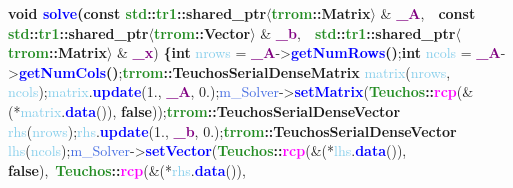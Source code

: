          \tab\textbf{\textcolor{BrickRed}{void} \textcolor{blue}{solve}(const \textcolor{ForestGreen}{std}::\textcolor{ForestGreen}{tr1}::\textcolor{Melon}{shared\_ptr}$\langle$\textcolor{ForestGreen}{trrom}::\textcolor{Melon}{Matrix}$\rangle$} \& \textbf{\textcolor{Purple}{\_A}},\newline\tab\tab\tab\ \ \textbf{const \textcolor{ForestGreen}{std}::\textcolor{ForestGreen}{tr1}::\textcolor{Melon}{shared\_ptr}$\langle$\textcolor{ForestGreen}{trrom}::\textcolor{Melon}{Vector}$\rangle$} \& \textbf{\textcolor{Purple}{\_b}},\newline\tab\tab\tab\ \ \textbf{\textcolor{ForestGreen}{std}::\textcolor{ForestGreen}{tr1}::\textcolor{Melon}{shared\_ptr}$\langle$\textcolor{ForestGreen}{trrom}::\textcolor{Melon}{Matrix}$\rangle$} \& \textbf{\textcolor{Purple}{\_x}}) \textbf{\{}\newline\tab\tab\textbf{\textcolor{BrickRed}{int}} \textcolor{SkyBlue}{nrows} = \textbf{\textcolor{Purple}{\_A}}-\textgreater\textbf{\textcolor{blue}{getNumRows}()};\newline\tab\tab\textbf{\textcolor{BrickRed}{int}} \textcolor{SkyBlue}{ncols} = \textbf{\textcolor{Purple}{\_A}}-\textgreater\textbf{\textcolor{blue}{getNumCols}()};\newline\newline\tab\tab\textbf{\textcolor{ForestGreen}{trrom}::\textcolor{Melon}{TeuchosSerialDenseMatrix}} \textcolor{SkyBlue}{matrix}(\textcolor{SkyBlue}{nrows}, \textcolor{SkyBlue}{ncols});\newline\tab\tab\textcolor{SkyBlue}{matrix}.\textbf{\textcolor{blue}{update}}(1., \textbf{\textcolor{Purple}{\_A}}, 0.);\newline\tab\tab\textcolor{RoyalBlue}{m\_Solver}-\textgreater\textbf{\textcolor{blue}{setMatrix}}(\textbf{\textcolor{ForestGreen}{Teuchos}::\textcolor{magenta}{rcp}}(\&(*\textcolor{SkyBlue}{matrix}.\textbf{\textcolor{blue}{data}}()), \textbf{false}));\newline\newline\tab\tab\textbf{\textcolor{ForestGreen}{trrom}::\textcolor{Melon}{TeuchosSerialDenseVector}} \textcolor{SkyBlue}{rhs}(\textcolor{SkyBlue}{nrows});\newline\tab\tab\textcolor{SkyBlue}{rhs}.\textbf{\textcolor{blue}{update}}(1., \textbf{\textcolor{Purple}{\_b}}, 0.);\newline\tab\tab\textbf{\textcolor{ForestGreen}{trrom}::\textcolor{Melon}{TeuchosSerialDenseVector}} \textcolor{SkyBlue}{lhs}(\textcolor{SkyBlue}{ncols});\newline\tab\tab\textcolor{RoyalBlue}{m\_Solver}-\textgreater\textbf{\textcolor{blue}{setVector}}(\textbf{\textcolor{ForestGreen}{Teuchos}::\textcolor{magenta}{rcp}}(\&(*\textcolor{SkyBlue}{lhs}.\textbf{\textcolor{blue}{data}}()), \textbf{false}),\newline\tab\tab\tab\tab\tab\tab\ \textbf{\textcolor{ForestGreen}{Teuchos}::\textcolor{magenta}{rcp}}(\&(*\textcolor{SkyBlue}{rhs}.\textbf{\textcolor{blue}{data}}()), 